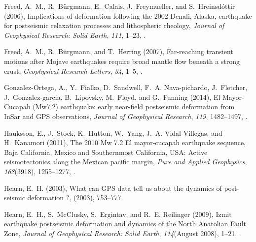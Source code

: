 \documentclass[draft,linenumbers]{AGUJournal}
\begin{document}
\begin{thebibliography}{52}
Freed, A.~M., R.~B{\"{u}}rgmann, E.~Calais, J.~Freymueller, and
  S.~Hreinsd{\'{o}}ttir (2006), {Implications of deformation following the 2002
  Denali, Alaska, earthquake for postseismic relaxation processes and
  lithospheric rheology}, \textit{Journal of Geophysical Research: Solid
  Earth}, \textit{111}, 1--23, .

Freed, A.~M., R.~B{\"{u}}rgmann, and T.~Herring (2007), {Far-reaching transient
  motions after Mojave earthquakes require broad mantle flow beneath a strong
  crust}, \textit{Geophysical Research Letters}, \textit{34}, 1--5,
  .

Gonzalez-Ortega, A., Y.~Fialko, D.~Sandwell, F.~A. Nava-pichardo, J.~Fletcher,
  J.~Gonzalez-garcia, B.~Lipovsky, M.~Floyd, and G.~Funning (2014), {El
  Mayor-Cucapah (Mw7.2) earthquake: early near-field postseismic deformation
  from InSar and GPS observations}, \textit{Journal of Geophysical Research},
  \textit{119}, 1482--1497, .

Hauksson, E., J.~Stock, K.~Hutton, W.~Yang, J.~A. Vidal-Villegas, and
  H.~Kanamori (2011), {The 2010 Mw 7.2 El mayor-cucapah earthquake sequence,
  Baja California, Mexico and Southernmost California, USA: Active
  seismotectonics along the Mexican pacific margin}, \textit{Pure and Applied
  Geophysics}, \textit{168}(3918), 1255--1277, .

Hearn, E.~H. (2003), {What can GPS data tell us about the dynamics of
  post-seismic deformation ?}, (2003), 753--777.

Hearn, E.~H., S.~McClusky, S.~Ergintav, and R.~E. Reilinger (2009), {Izmit
  earthquake postseismic deformation and dynamics of the North Anatolian Fault
  Zone}, \textit{Journal of Geophysical Research: Solid Earth},
  \textit{114}(August 2008), 1--21, .


\end{thebibliography}
\end{document}
